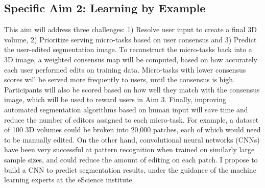
\subsection*{Specific Aim 2: Learning by Example}
This aim will address three challenges: 1) Resolve user input to create a final 3D volume, 2) Prioritize serving micro-tasks based on user consensus and 3) Predict the user-edited segmentation image. To reconstruct the micro-tasks back into a 3D image, a weighted consensus map will be computed, based on how accurately each user performed edits on training data. Micro-tasks with lower consensus scores will be served more frequently to users, until the consensus is high. Participants will also be scored based on how well they match with the consensus image, which will be used to reward users in Aim 3. Finally, improving automated segmentation algorithms based on human input will save time and reduce the number of editors assigned to each micro-task. For example, a dataset of 100 3D volumes could be broken into 20,000 patches, each of which would need to be manually edited. On the other hand, convolutional neural networks (CNNs) have been very successful at pattern recognition when trained on similarly large sample sizes, and could reduce the amount of editing on each patch. I propose to build a CNN to predict segmentation results, under the guidance of the machine learning experts at the eScience institute. 

